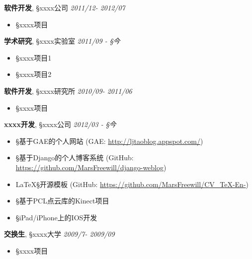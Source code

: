 \documentclass[paper=a4]{article}
\newenvironment{changemargin}[2]{%
  \begin{list}{}{%
    \setlength{\topsep}{0pt}%
    \setlength{\leftmargin}{#1}%
    \setlength{\rightmargin}{#2}%
    \setlength{\listparindent}{\parindent}%
    \setlength{\itemindent}{\parindent}%
    \setlength{\parsep}{\parskip}%
  }%
  \item[]}{\end{list}
}
\newenvironment{body} {
	\vspace*{-15pt}
	\begin{changemargin}{-0.5in}{-0.5in}
  }	
	{\end{changemargin}
}
\begin{document}
\begin{body}
	\vspace{14pt}
	\textbf{\ZS 软件开发}, {\S xxxx公司} \hfill \emph{2011/12- 2012/07}\\
	\vspace*{-4pt}
	\begin{itemize} \itemsep -0pt  %
		\item[\HandRight] {\S xxxx项目}
	\end{itemize}
	
	\textbf {\ZS 学术研究}, {\S xxxx实验室} \hfill \emph{2011/09 - {\S 今}}\\
	\vspace*{-4pt}
	\begin{itemize} \itemsep -0pt
	         \item[\HandRight] {\S xxxx项目1}
		\item[\HandRight] {\S xxxx项目2}
	\end{itemize}
	
	\textbf{\ZS 软件开发}, {\S xxxx研究所} \hfill \emph{2010/09- 2011/06}\\
	\vspace*{-4pt}
	\begin{itemize} \itemsep -0pt  %
		\item[\HandRight]  {\S xxxx项目}
	\end{itemize}

	\textbf{\ZS xxxx开发}, {\S xxxx公司} \hfill \emph{2012/03 - {\S 今}}\\
	\vspace*{-4pt}
	\begin{itemize} \itemsep -0pt  %
		\item[\HandRight] {\S 基于GAE的个人网站} (GAE: \url{http://ljtaoblog.appspot.com/})
		\item[\HandRight] {\S 基于Django的个人博客系统} (GitHub: \url{https://github.com/MarsFreewill/django-weblog})
		\item[\HandRight] {\LaTeX \S{开源模板}} (GitHub: \url{https://github.com/MarsFreewill/CV_TeX-En-})
		\item[\HandRight] {\S 基于PCL点云库的Kinect项目}
		\item[\HandRight] {\S iPad/iPhone上的IOS开发}
	\end{itemize}

	\textbf{\ZS 交换生}, {\S xxxx大学} \hfill \emph{2009/7- 2009/09}\\
	\vspace*{-4pt}
	\begin{itemize} \itemsep -0pt  %
		\item[\HandRight]  {\S xxxx项目}
	\end{itemize}
	
\end{body}
\end{document}
